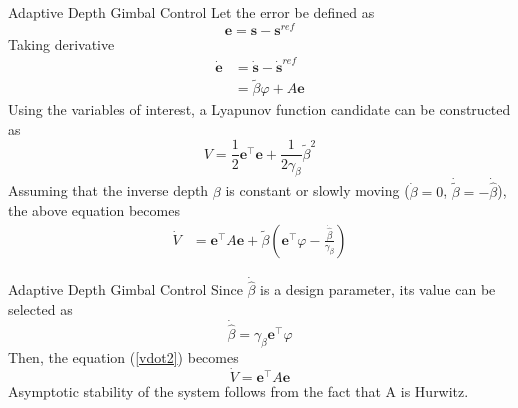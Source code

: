 \documentclass[9pt]{beamer}
\begin{document}
\begin{frame}{Adaptive Depth Gimbal Control}
Let the error be defined as 
\begin{equation}
\mathbf{e}=\mathbf{s}-\mathbf{s}^{ref}
\end{equation}
Taking derivative
\begin{align}
\dot{\mathbf{e}}&=\dot{\mathbf{s}}-\dot{\mathbf{s}}^{ref}
\\&=\tilde{\beta}\varphi+A\mathbf{e}
\end{align}
Using the variables of interest, a Lyapunov function candidate can be constructed as 
\begin{equation}
V=\frac{1}{2}\mathbf{e}^\top\mathbf{e}+\frac{1}{2\gamma_\beta}\tilde{\beta}^2
\end{equation}
Assuming that the inverse depth $\beta$ is constant or slowly moving ($\dot{\beta}=0$, $\dot{\tilde{\beta}}=-\dot{\hat{\beta}}$), the above equation becomes
\begin{align}
\dot{V}&=\mathbf{e}^\top A\mathbf{e}+\tilde{\beta}(\mathbf{e}^\top\varphi-\frac{\dot{\hat{\beta}}}{\gamma_\beta})
\label{vdot2}
\end{align}
\end{frame}

\begin{frame}{Adaptive Depth Gimbal Control}
Since $\dot{\hat{\beta}}$ is a design parameter, its value can be selected as 
\begin{equation}
\dot{\hat{\beta}}=\gamma_\beta\mathbf{e}^\top\varphi
\end{equation}
Then, the equation (\ref{vdot2}) becomes
\begin{equation}
\dot{V}=\mathbf{e}^\top A\mathbf{e}
\end{equation}
Asymptotic stability of the system follows from the fact that A is Hurwitz.
\end{frame}
\end{document}
